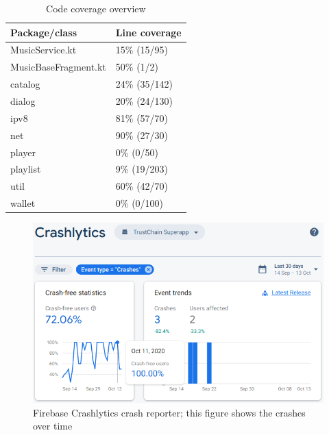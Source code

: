 \begin{table}[]
\begin{tabular}{|l|l|}
\hline
\textbf{Package/class} & \textbf{Line coverage} \\ \hline
MusicService.kt        & 15\% (15/95)           \\ \hline
MusicBaseFragment.kt   & 50\% (1/2)             \\ \hline
catalog                & 24\% (35/142)          \\ \hline
dialog                 & 20\% (24/130)          \\ \hline
ipv8                   & 81\% (57/70)           \\ \hline
net                    & 90\% (27/30)           \\ \hline
player                 & 0\% (0/50)             \\ \hline
playlist               & 9\% (19/203)           \\ \hline
util                   & 60\% (42/70)           \\ \hline
wallet                 & 0\% (0/100)            \\ \hline
\end{tabular}
\caption{Code coverage overview}
\label{tab:code-cov}
\end{table}

\begin{figure}
    \includegraphics[width=0.7\linewidth]{implementation/firebase-crashlytics.png}
    \caption{Firebase Crashlytics crash reporter; this figure shows the crashes over time}
    \label{fig:firebase-crashlytics}
\end{figure}